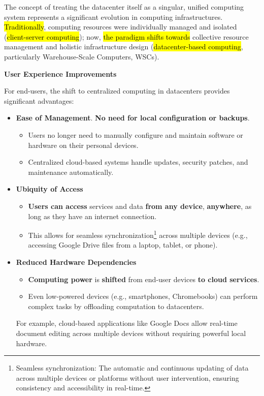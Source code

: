 The concept of treating the datacenter itself as a singular, unified computing system represents a significant evolution in computing infrastructures. \hl{Traditionally}, computing resources were individually managed and isolated (\hl{client-server computing}); now, \hl{the paradigm shifts towards} collective resource management and holistic infrastructure design (\hl{datacenter-based computing}, particularly Warehouse-Scale Computers, WSCs).

\highspace
\begin{flushleft}
    \textcolor{Green3}{ \textbf{User Experience Improvements}}
\end{flushleft}
For end-users, the shift to centralized computing in datacenters provides significant advantages:
\begin{itemize}
    \item \textcolor{Green3}{\textbf{Ease of Management}}. \textbf{No need for local configuration or backups}.
    \begin{itemize}[label=\textcolor{Green3}{}]
        \item Users no longer need to manually configure and maintain software or hardware on their personal devices.
        \item Centralized cloud-based systems handle updates, security patches, and maintenance automatically.
    \end{itemize}
    \item \textcolor{Green3}{\textbf{Ubiquity of Access}}
    \begin{itemize}[label=\textcolor{Green3}{}]
        \item \textbf{Users can access} services and data \textbf{from any device}, \textbf{anywhere}, as long as they have an internet connection.
        \item This allows for seamless synchronization\footnote{Seamless synchronization: The automatic and continuous updating of data across multiple devices or platforms without user intervention, ensuring consistency and accessibility in real-time.} across multiple devices (e.g., accessing Google Drive files from a laptop, tablet, or phone).
    \end{itemize}
    \item \textcolor{Green3}{\textbf{Reduced Hardware Dependencies}}
    \begin{itemize}[label=\textcolor{Green3}{}]
        \item \textbf{Computing power} is \textbf{shifted} from end-user devices \textbf{to cloud services}.
        \item Even low-powered devices (e.g., smartphones, Chromebooks) can perform complex tasks by offloading computation to datacenters.
    \end{itemize}
    For example, cloud-based applications like Google Docs allow real-time document editing across multiple devices without requiring powerful local hardware.
\end{itemize}

